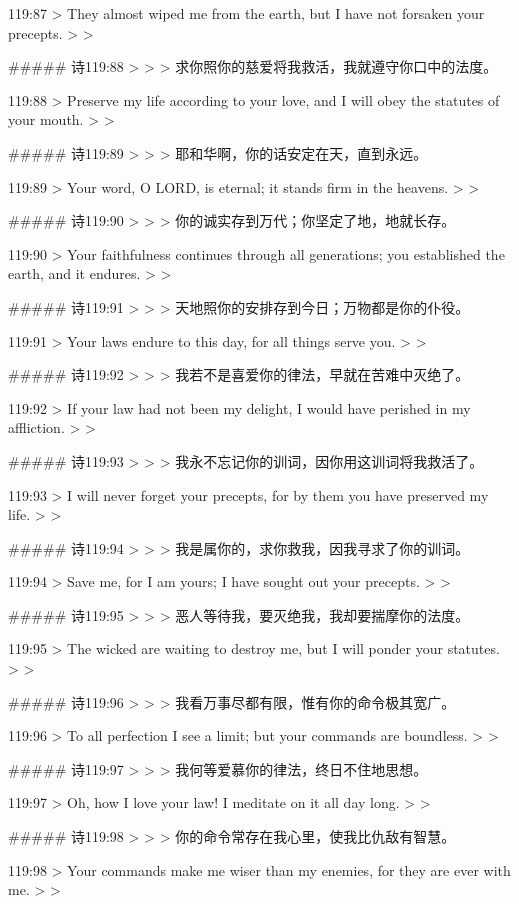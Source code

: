 119:87
> They almost wiped me from the earth, but I have not forsaken your precepts.
>
> 


##### 诗119:88
> 
>
> 求你照你的慈爱将我救活，我就遵守你口中的法度。


119:88
> Preserve my life according to your love, and I will obey the statutes of your mouth.
>
> 


##### 诗119:89
> 
>
> 耶和华啊，你的话安定在天，直到永远。


119:89
> Your word, O LORD, is eternal; it stands firm in the heavens.
>
> 


##### 诗119:90
> 
>
> 你的诚实存到万代；你坚定了地，地就长存。


119:90
> Your faithfulness continues through all generations; you established the earth, and it endures.
>
> 


##### 诗119:91
> 
>
> 天地照你的安排存到今日；万物都是你的仆役。


119:91
> Your laws endure to this day, for all things serve you.
>
> 


##### 诗119:92
> 
>
> 我若不是喜爱你的律法，早就在苦难中灭绝了。


119:92
> If your law had not been my delight, I would have perished in my affliction.
>
> 


##### 诗119:93
> 
>
> 我永不忘记你的训词，因你用这训词将我救活了。


119:93
> I will never forget your precepts, for by them you have preserved my life.
>
> 


##### 诗119:94
> 
>
> 我是属你的，求你救我，因我寻求了你的训词。


119:94
> Save me, for I am yours; I have sought out your precepts.
>
> 


##### 诗119:95
> 
>
> 恶人等待我，要灭绝我，我却要揣摩你的法度。


119:95
> The wicked are waiting to destroy me, but I will ponder your statutes.
>
> 


##### 诗119:96
> 
>
> 我看万事尽都有限，惟有你的命令极其宽广。


119:96
> To all perfection I see a limit; but your commands are boundless.
>
> 


##### 诗119:97
> 
>
> 我何等爱慕你的律法，终日不住地思想。


119:97
> Oh, how I love your law! I meditate on it all day long.
>
> 


##### 诗119:98
> 
>
> 你的命令常存在我心里，使我比仇敌有智慧。


119:98
> Your commands make me wiser than my enemies, for they are ever with me.
>
> 


